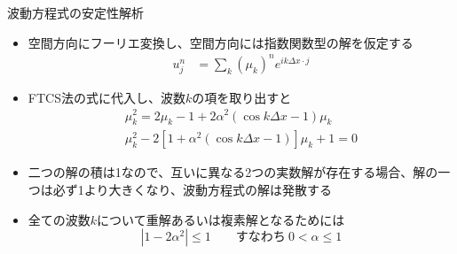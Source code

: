 \begin{frame}[t]{波動方程式の安定性解析}
  \begin{itemize}
  \item 空間方向にフーリエ変換し、空間方向には指数関数型の解を仮定する
    \begin{align*}
    u_j^n &= \sum_k (\mu_k)^n e^{ik\Delta x \cdot j}
    \end{align*}
  \item FTCS法の式に代入し、波数$k$の項を取り出すと
    \begin{align*}
    \mu_k^2 =  2\mu_k - 1 + 2\alpha^2(\cos k \Delta x - 1) \mu_k \\
    \mu_k^2 - 2 [1 + \alpha^2(\cos k \Delta x - 1)] \mu_k + 1 = 0
    \end{align*}
  \item 二つの解の積は1なので、互いに異なる2つの実数解が存在する場合、解の一つは必ず1より大きくなり、波動方程式の解は発散する
  \item 全ての波数\(k\)について重解あるいは複素解となるためには
    \[
      | 1 - 2 \alpha^2 | \le 1 \qquad \text{すなわち} \ 0 < \alpha \le 1
    \]
  \end{itemize}
\end{frame}

